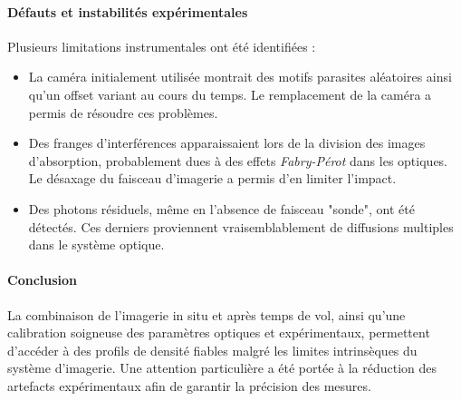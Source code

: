 %

\paragraph{Défauts et instabilités expérimentales}

Plusieurs limitations instrumentales ont été identifiées :
\begin{itemize}[label = $\bullet$]
    \item La caméra initialement utilisée montrait des motifs parasites aléatoires ainsi qu’un offset variant au cours du temps. Le remplacement de la caméra a permis de résoudre ces problèmes.
    \item Des franges d’interférences apparaissaient lors de la division des images d’absorption, probablement dues à des effets {\em Fabry-Pérot} dans les optiques. Le désaxage du faisceau d’imagerie a permis d’en limiter l’impact.
    \item Des photons résiduels, même en l’absence de faisceau "sonde", ont été détectés. Ces derniers proviennent vraisemblablement de diffusions multiples dans le système optique.
\end{itemize}

\paragraph{Conclusion}

La combinaison de l’imagerie in situ et après temps de vol, ainsi qu’une calibration soigneuse des paramètres optiques et expérimentaux, permettent d’accéder à des profils de densité fiables malgré les limites intrinsèques du système d’imagerie. Une attention particulière a été portée à la réduction des artefacts expérimentaux afin de garantir la précision des mesures.


%


